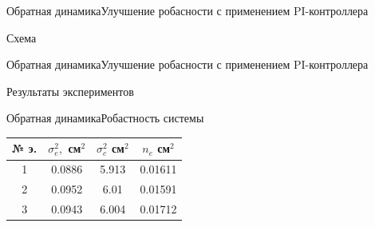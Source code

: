 \begin{frame}{Обратная динамика}{Улучшение робасности с применением PI-контроллера}
    \begin{block}{Схема}
    \end{block}
\end{frame}

\begin{frame}{Обратная динамика}{Улучшение робасности с применением PI-контроллера}
    \begin{block}{Результаты экспериментов}
    \end{block}
\end{frame}


\begin{frame}{Обратная динамика}{Робастность системы}

\begin{table}[H]
    \begin{tabular}{|c|c|c|c|}
        \hline 
        № э.& $\sigma^2_e,$ см$^2$ & $\sigma^2_c$ см$^2$ & $n_e$ см$^2$ \\ \hline 
        1& 0.0886 & 5.913 & 0.01611\\ \hline
        2& 0.0952 & 6.01  & 0.01591 \\ \hline
        3& 0.0943 & 6.004 & 0.01712\\ \hline

    \end{tabular}
\end{table}
\end{frame}
 
